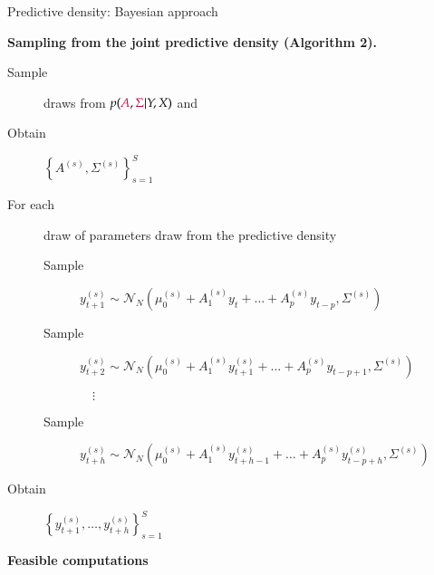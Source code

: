 \documentclass[notes,blackandwhite,mathsans,usenames,dvipsnames]{beamer}
\begin{document}
\begin{frame}{Predictive density: Bayesian approach}

\textbf{Sampling from the joint predictive density (Algorithm 2).}

\bigskip 
\begin{description}
\item[Sample] {\color{mcxs2}draws from} $p({\color{purple}A}, {\color{purple}\Sigma}|Y,X)$ {\color{mcxs2}and} 

\bigskip\item[Obtain] $\left\{ A^{(s)}, \Sigma^{(s)}\right\}_{s=1}^{S}$

\bigskip\item[For each] draw of parameters draw from the predictive density
	\begin{description}
	\item[Sample] $y_{t+1}^{(s)}\sim\mathcal{N}_N\left( \mu_0^{(s)} + A_1^{(s)} y_{t}+\dots+A_p^{(s)}y_{t-p} ,\Sigma^{(s)}\right)$
	\item[Sample] $y_{t+2}^{(s)}\sim\mathcal{N}_N\left( \mu_0^{(s)} + A_1^{(s)} y_{t+1}^{(s)}+\dots+A_p^{(s)}y_{t-p+1} ,\Sigma^{(s)}\right)$
	\item[]$\quad\vdots$
	\item[Sample] $y_{t+h}^{(s)}\sim\mathcal{N}_N\left( \mu_0^{(s)} + A_1^{(s)} y_{t+h-1}^{(s)}+\dots+A_p^{(s)}y_{t-p+h}^{(s)} ,\Sigma^{(s)}\right)$
	\end{description}


\bigskip\item[Obtain] $\left\{ y_{t+1}^{(s)},\dots,y_{t+h}^{(s)}\right\}_{s=1}^{S}$

\end{description}

\end{frame}





{
\begin{frame}

\begin{adjustwidth}{-0.5cm}{0cm}
\vspace{8.3cm}\Large
\textbf{{\color{mcxs1}Feasible} {\color{mcxs5}computations}}
\end{adjustwidth}

\end{frame}
}
\end{document}
